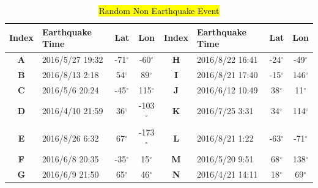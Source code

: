 \documentclass[3p,authoryear,preprint,12pt]{elsarticle}
\begin{document}
\begin{table}[htbp]
	\caption{\hl{Random Non Earthquake Event}}
	\label{tab:random non earthquake event}
	\centering
	\begin{tabular}{clcc|clcc}
		\toprule
		\textbf{Index}&\textbf{Earthquake Time}               & \textbf{Lat}  & \textbf{Lon}  &\textbf{Index}&\textbf{Earthquake Time}               & \textbf{Lat}  & \textbf{Lon}  \\ \midrule
		\textbf{A}&2016/5/27 19:32 & -71$^\circ$ & -60$^\circ$  &\textbf{H} &2016/8/22 16:41  & -24$^\circ$ & -49$^\circ$ \\
		\textbf{B}&2016/8/13 2:18  & 54$^\circ$  & 89$^\circ$   &\textbf{I}& 2016/8/21 17:40 & -15$^\circ$ & 146$^\circ$ \\
		\textbf{C}&2016/5/6 20:24   & -45$^\circ$ &115$^\circ$ & \textbf{J}&2016/6/12 10:49  & 38$^\circ$  & 11$^\circ$  \\
		\textbf{D}&2016/4/10 21:59  & 36$^\circ$  & -103$^\circ$ &\textbf{K} &2016/7/25 3:31   & 34$^\circ$  & 114$^\circ$ \\
		\textbf{E}&2016/8/26 6:32   & 67$^\circ$  & -173$^\circ$ & \textbf{L}&2016/8/21 1:22   & -63$^\circ$ & -71$^\circ$ \\
		\textbf{F}&2016/6/8 20:35   & -35$^\circ$ &15$^\circ$ & \textbf{M}&2016/5/20 9:51   & 68$^\circ$  & 138$^\circ$ \\
		\textbf{G}&2016/6/9 21:50  & 65$^\circ$  & 46$^\circ$   &\textbf{N}& 2016/4/21 14:11  & 18$^\circ$  & 69$^\circ$  \\ \bottomrule
	\end{tabular}
\end{table}
\end{document}
